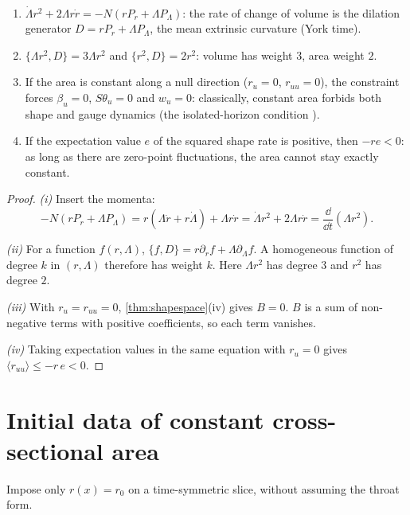 \begin{proposition}\label{prop:weights}\ver\
\begin{enumerate}[label=(\roman*)]
\item $\dot\Lambda r^2+2\Lambda r\dot r=-N(rP_r+\Lambda P_\Lambda)$: the rate of change of volume is the dilation generator $D=rP_r+\Lambda P_\Lambda$, the mean extrinsic curvature (York time).
\item $\{\Lambda r^2,D\}=3\Lambda r^2$ and $\{r^2,D\}=2r^2$: volume has weight $3$, area weight $2$.
\item If the area is constant along a null direction ($r_u=0$, $r_{uu}=0$), the constraint forces $\beta_u=0$, $S\theta_u=0$ and $w_u=0$: classically, constant area forbids both shape and gauge dynamics (the isolated-horizon condition \cite{AshtekarKrishnan2004}).
\item If the expectation value $e$ of the squared shape rate is positive, then $-re<0$: as long as there are zero-point fluctuations, the area cannot stay exactly constant.
\end{enumerate}
\end{proposition}
\begin{proof}
\emph{(i)} Insert the momenta:
\[
-N(rP_r+\Lambda P_\Lambda)=r(\Lambda\dot r+r\dot\Lambda)+\Lambda r\dot r=\dot\Lambda r^2+2\Lambda r\dot r=\frac{\dd}{\dd t}(\Lambda r^2).
\]

\emph{(ii)} For a function $f(r,\Lambda)$, $\{f,D\}=r\partial_rf+\Lambda\partial_\Lambda f$. A homogeneous function of degree $k$ in $(r,\Lambda)$ therefore has weight $k$. Here $\Lambda r^2$ has degree $3$ and $r^2$ has degree $2$.

\emph{(iii)} With $r_u=r_{uu}=0$, \cref{thm:shapespace}(iv) gives $B=0$. $B$ is a sum of non-negative terms with positive coefficients, so each term vanishes.

\emph{(iv)} Taking expectation values in the same equation with $r_u=0$ gives $\langle r_{uu}\rangle\le-r\,e<0$.
\end{proof}


\section{Initial data of constant cross-sectional area}

Impose only $r(x)=r_0$ on a time-symmetric slice, without assuming the throat form.


